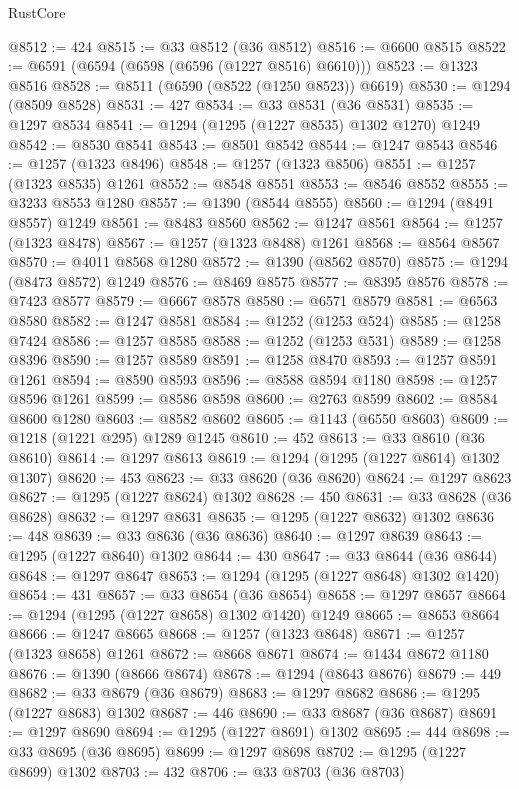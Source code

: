 \begin{lexlean}{RustCore}
\begin{coremodule}
@8512 := 424
@8515 := @33 @8512 (@36 @8512)
@8516 := @6600 @8515
@8522 := @6591 (@6594 (@6598 (@6596 (@1227 @8516) @6610)))
@8523 := @1323 @8516
@8528 := @8511 (@6590 (@8522 (@1250 @8523)) @6619)
@8530 := @1294 (@8509 @8528)
@8531 := 427
@8534 := @33 @8531 (@36 @8531)
@8535 := @1297 @8534
@8541 := @1294 (@1295 (@1227 @8535) @1302 @1270) @1249
@8542 := @8530 @8541
@8543 := @8501 @8542
@8544 := @1247 @8543
@8546 := @1257 (@1323 @8496)
@8548 := @1257 (@1323 @8506)
@8551 := @1257 (@1323 @8535) @1261
@8552 := @8548 @8551
@8553 := @8546 @8552
@8555 := @3233 @8553 @1280
@8557 := @1390 (@8544 @8555)
@8560 := @1294 (@8491 @8557) @1249
@8561 := @8483 @8560
@8562 := @1247 @8561
@8564 := @1257 (@1323 @8478)
@8567 := @1257 (@1323 @8488) @1261
@8568 := @8564 @8567
@8570 := @4011 @8568 @1280
@8572 := @1390 (@8562 @8570)
@8575 := @1294 (@8473 @8572) @1249
@8576 := @8469 @8575
@8577 := @8395 @8576
@8578 := @7423 @8577
@8579 := @6667 @8578
@8580 := @6571 @8579
@8581 := @6563 @8580
@8582 := @1247 @8581
@8584 := @1252 (@1253 @524)
@8585 := @1258 @7424
@8586 := @1257 @8585
@8588 := @1252 (@1253 @531)
@8589 := @1258 @8396
@8590 := @1257 @8589
@8591 := @1258 @8470
@8593 := @1257 @8591 @1261
@8594 := @8590 @8593
@8596 := @8588 @8594 @1180
@8598 := @1257 @8596 @1261
@8599 := @8586 @8598
@8600 := @2763 @8599
@8602 := @8584 @8600 @1280
@8603 := @8582 @8602
@8605 := @1143 (@6550 @8603)
@8609 := @1218 (@1221 @295) @1289 @1245
@8610 := 452
@8613 := @33 @8610 (@36 @8610)
@8614 := @1297 @8613
@8619 := @1294 (@1295 (@1227 @8614) @1302 @1307)
@8620 := 453
@8623 := @33 @8620 (@36 @8620)
@8624 := @1297 @8623
@8627 := @1295 (@1227 @8624) @1302
@8628 := 450
@8631 := @33 @8628 (@36 @8628)
@8632 := @1297 @8631
@8635 := @1295 (@1227 @8632) @1302
@8636 := 448
@8639 := @33 @8636 (@36 @8636)
@8640 := @1297 @8639
@8643 := @1295 (@1227 @8640) @1302
@8644 := 430
@8647 := @33 @8644 (@36 @8644)
@8648 := @1297 @8647
@8653 := @1294 (@1295 (@1227 @8648) @1302 @1420)
@8654 := 431
@8657 := @33 @8654 (@36 @8654)
@8658 := @1297 @8657
@8664 := @1294 (@1295 (@1227 @8658) @1302 @1420) @1249
@8665 := @8653 @8664
@8666 := @1247 @8665
@8668 := @1257 (@1323 @8648)
@8671 := @1257 (@1323 @8658) @1261
@8672 := @8668 @8671
@8674 := @1434 @8672 @1180
@8676 := @1390 (@8666 @8674)
@8678 := @1294 (@8643 @8676)
@8679 := 449
@8682 := @33 @8679 (@36 @8679)
@8683 := @1297 @8682
@8686 := @1295 (@1227 @8683) @1302
@8687 := 446
@8690 := @33 @8687 (@36 @8687)
@8691 := @1297 @8690
@8694 := @1295 (@1227 @8691) @1302
@8695 := 444
@8698 := @33 @8695 (@36 @8695)
@8699 := @1297 @8698
@8702 := @1295 (@1227 @8699) @1302
@8703 := 432
@8706 := @33 @8703 (@36 @8703)

\end{coremodule}
\end{lexlean}
